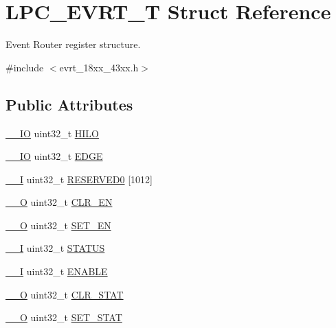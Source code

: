 \hypertarget{struct_l_p_c___e_v_r_t___t}{}\section{L\+P\+C\+\_\+\+E\+V\+R\+T\+\_\+T Struct Reference}
\label{struct_l_p_c___e_v_r_t___t}


Event Router register structure.  




{\ttfamily \#include $<$evrt\+\_\+18xx\+\_\+43xx.\+h$>$}

\subsection*{Public Attributes}
\begin{DoxyCompactItemize}
\item 
\hyperlink{core__sc300_8h_aec43007d9998a0a0e01faede4133d6be}{\+\_\+\+\_\+\+IO} uint32\+\_\+t \hyperlink{struct_l_p_c___e_v_r_t___t_af79dde0a264d9491ee6b2f718c5e00b7}{H\+I\+LO}
\item 
\hyperlink{core__sc300_8h_aec43007d9998a0a0e01faede4133d6be}{\+\_\+\+\_\+\+IO} uint32\+\_\+t \hyperlink{struct_l_p_c___e_v_r_t___t_af4e9a32b3dfe1c518e5622360adbb8c4}{E\+D\+GE}
\item 
\hyperlink{core__sc300_8h_af63697ed9952cc71e1225efe205f6cd3}{\+\_\+\+\_\+I} uint32\+\_\+t \hyperlink{struct_l_p_c___e_v_r_t___t_adc81572ed2683184ad85263867eadb8a}{R\+E\+S\+E\+R\+V\+E\+D0} \mbox{[}1012\mbox{]}
\item 
\hyperlink{core__sc300_8h_a7e25d9380f9ef903923964322e71f2f6}{\+\_\+\+\_\+O} uint32\+\_\+t \hyperlink{struct_l_p_c___e_v_r_t___t_a07d1f1adf7919c0caa92493c6e41eceb}{C\+L\+R\+\_\+\+EN}
\item 
\hyperlink{core__sc300_8h_a7e25d9380f9ef903923964322e71f2f6}{\+\_\+\+\_\+O} uint32\+\_\+t \hyperlink{struct_l_p_c___e_v_r_t___t_aa4c25c5bfce5bc3173833ceffa5f3757}{S\+E\+T\+\_\+\+EN}
\item 
\hyperlink{core__sc300_8h_af63697ed9952cc71e1225efe205f6cd3}{\+\_\+\+\_\+I} uint32\+\_\+t \hyperlink{struct_l_p_c___e_v_r_t___t_aec8df9a00928b61ccfc43f9ce347cf0e}{S\+T\+A\+T\+US}
\item 
\hyperlink{core__sc300_8h_af63697ed9952cc71e1225efe205f6cd3}{\+\_\+\+\_\+I} uint32\+\_\+t \hyperlink{struct_l_p_c___e_v_r_t___t_aff8443ccf28b9b53442986efbbe34535}{E\+N\+A\+B\+LE}
\item 
\hyperlink{core__sc300_8h_a7e25d9380f9ef903923964322e71f2f6}{\+\_\+\+\_\+O} uint32\+\_\+t \hyperlink{struct_l_p_c___e_v_r_t___t_a3698488eb89a8775f3fabebe71669107}{C\+L\+R\+\_\+\+S\+T\+AT}
\item 
\hyperlink{core__sc300_8h_a7e25d9380f9ef903923964322e71f2f6}{\+\_\+\+\_\+O} uint32\+\_\+t \hyperlink{struct_l_p_c___e_v_r_t___t_a3c34d8f47ca90a8031905ef6387e0962}{S\+E\+T\+\_\+\+S\+T\+AT}
\end{DoxyCompactItemize}


